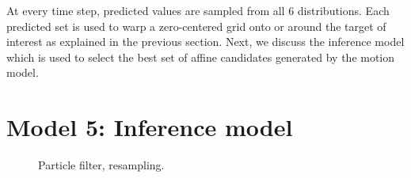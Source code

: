 \begin{Body}
At every time step, predicted values are sampled from all 6 distributions.  Each predicted set is used to warp a zero-centered grid onto or around the target of interest as explained in the previous section.  Next, we discuss the inference model which is used to select the best set of affine candidates generated by the motion model.

\section{Model 5: Inference model}
								\begin{figure}[t]
								\centering
								\caption{Particle filter, resampling.}
								\label{fig:particle_filter_resampling}
								\end{figure}



\end{Body}
